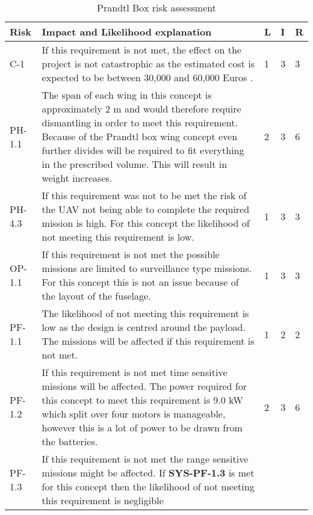 \begin{table}[]
    \centering
    \caption{Prandtl Box risk assessment}
    \label{tab:pran_box_risk_asse}
    \begin{tabularx}{\textwidth}{l L l l l}
        \toprule
        Risk            & Impact and Likelihood explanation                & L     & I     & R
        \\ \midrule
        C-1             & If this requirement is not met, the effect on the project is not catastrophic as the estimated cost is expected to be between 30,000 and 60,000 Euros \footnotemark.                                                                     & 1     & 3     & 3
        \\ \hdashline
        PH-1.1          & The span of each wing in this concept is approximately 2 m and would therefore require dismantling in order to meet this requirement. Because of the Prandtl box wing concept even further divides will be required to fit everything in the prescribed volume. This will result in weight increases.    & 2 & 3 & 6  
        \\ \hdashline
        PH-4.3          & If this requirement was not to be met the risk of the UAV not being able to complete the required mission is high. For this concept the likelihood of not meeting this requirement is low.                                                                                 & 1      & 3     & 3 
        \\ \hdashline
        OP-1.1          & If this requirement is not met the possible missions are limited to surveillance type missions. For this concept this is not an issue because of the layout of the fuselage.   & 1 & 3 & 3
        \\ \hdashline
        PF-1.1          & The likelihood of not meeting this requirement is low as the design is centred around the payload. The missions will be affected if this requirement is not met.                                                                                                                 & 1 & 2 & 2
        \\ \hdashline
        PF-1.2          & If this requirement is not met time sensitive missions will be affected. The power required for this concept to meet this requirement is 9.0 kW which split over four motors is manageable, however this is a lot of power to be drawn from the batteries.  & 2 & 3 & 6
        \\ \hdashline
        PF-1.3          & If this requirement is not met the range sensitive missions might be affected. If \textbf{SYS-PF-1.3} is met for this concept then the likelihood of not meeting this requirement is negligible

\end{tabularx}
\end{table}
